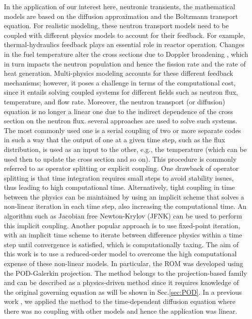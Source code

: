 \documentclass[review,number,sort&compress,12pt]{elsarticle}
\begin{document}
In the application of our interest here, neutronic transients, the mathematical models are based on the diffusion approximation and the Boltzmann transport equation.
For realistic modeling, these neutron transport models need to be coupled with different physics models to account for their feedback.
For example, thermal-hydraulics feedback plays an essential role in reactor operation.
Changes in the fuel temperature alter the cross sections due to Doppler broadening \cite{stacey2018nuclear}, which in turn impacts the neutron population and hence the fission rate and the rate of heat generation.
Multi-physics modeling accounts for these different feedback mechanisms; however, it poses a challenge in terms of the computational cost,
since it entails solving coupled systems for different fields such as neutron flux, temperature, and flow rate.
Moreover, the neutron transport (or diffusion) equation is no longer a linear one due to the indirect dependence of the cross section on the neutron flux.
several approaches are used to solve such systems.
The most commonly used one is a serial coupling of two or more separate codes in such a way that the output of one at a given time step, such as the flux distribution, is used as an input to the other, e.g., the temperature (which can be used then to update the cross section and so on).
This procedure is commonly referred to as operator splitting or explicit coupling.
One drawback of operator splitting is that time integration requires small steps to avoid stability issues, thus leading to high computational time. 
Alternatively, tight coupling in time between the physics can be maintained by using an implicit scheme that solves a non-linear iteration in each time step, also increasing the computational time.
An algorithm such as Jacobian free Newton-Krylov (JFNK) \cite{gaston2009parallel} can be used to perform this implicit coupling.
Another popular approach is to use fixed-point iteration, with an implicit time scheme to iterate between difference physics within a time step until convergence is satisfied, which is computationally taxing.
The aim of this work is to use a reduced-order model to overcome the high computational expense of these non-linear models.
In particular, the ROM was developed using the POD-Galerkin projection.
The method belongs to the projection-based family and can be described as a physics-driven method since it requires knowledge of the original governing equation as will be shown in Sec.\ref{sec:POD}.
In a previous work \cite{elzohery2021exploring}, we applied the method to the time-dependent diffusion equation where there was no coupling with other models and hence the application was linear.
\end{document}
